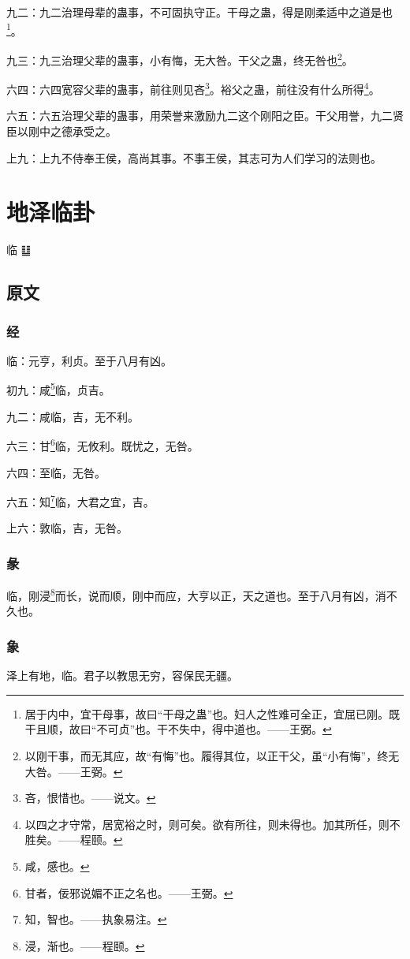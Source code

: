 \documentclass[12pt,oneside]{book}
\begin{document}
九二：九二治理母辈的蛊事，不可固执守正。干母之蛊，得是刚柔适中之道是也\footnote{居于内中，宜干母事，故曰“干母之蛊”也。妇人之性难可全正，宜屈已刚。既干且顺，故曰“不可贞”也。干不失中，得中道也。——王弼。}。

九三：九三治理父辈的蛊事，小有悔，无大咎。干父之蛊，终无咎也\footnote{以刚干事，而无其应，故“有悔”也。履得其位，以正干父，虽“小有悔”，终无大咎。——王弼。}。

六四：六四宽容父辈的蛊事，前往则见吝\footnote{吝，恨惜也。——说文。}。裕父之蛊，前往没有什么所得\footnote{以四之才守常，居宽裕之时，则可矣。欲有所往，则未得也。加其所任，则不胜矣。——程颐。}。

六五：六五治理父辈的蛊事，用荣誉来激励九二这个刚阳之臣。干父用誉，九二贤臣以刚中之德承受之。

上九：上九不侍奉王侯，高尚其事。不事王侯，其志可为人们学习的法则也。



\chapter{地泽临卦}
临 {\Large ䷒}

\section{原文}

\subsection{经}
临：元亨，利贞。至于八月有凶。

初九：咸\footnote{咸，感也。}临，贞吉。

九二：咸临，吉，无不利。

六三：甘\footnote{甘者，佞邪说媚不正之名也。——王弼。}临，无攸利。既忧之，无咎。

六四：至临，无咎。

六五：知\footnote{知，智也。——执象易注。}临，大君之宜，吉。

上六：敦临，吉，无咎。

\subsection{彖}
临，刚浸\footnote{浸，渐也。——程颐。}而长，说而顺，刚中而应，大亨以正，天之道也。至于八月有凶，消不久也。

\subsection{象}
泽上有地，临。君子以教思无穷，容保民无疆。
\end{document}
